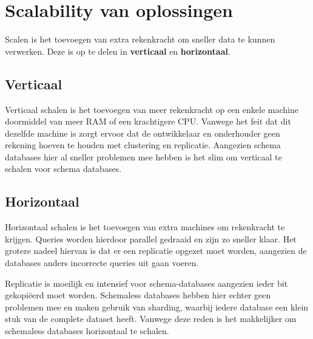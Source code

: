 \section{Scalability van oplossingen}

Scalen is het toevoegen van extra rekenkracht om sneller data te kunnen verwerken. Deze is op te delen in \textbf{verticaal} en \textbf{horizontaal}.

\subsection{Verticaal}

Verticaal schalen is het toevoegen van meer rekenkracht op een enkele machine doormiddel van meer RAM of een krachtigere CPU. Vanwege het feit dat dit dezelfde machine is zorgt ervoor dat de ontwikkelaar en onderhouder geen rekening hoeven te houden met clustering en replicatie. Aangezien schema databases hier al sneller problemen mee hebben is het slim om verticaal te schalen voor schema databases.

\subsection{Horizontaal}

Horizontaal schalen is het toevoegen van extra machines om rekenkracht te krijgen. Queries worden hierdoor parallel gedraaid en zijn zo sneller klaar. Het grotere nadeel hiervan is dat er een replicatie opgezet moet worden, aangezien de databases anders incorrecte queries uit gaan voeren. 

Replicatie is moeilijk en intensief voor schema-databases aangezien ieder bit gekopi\"eerd moet worden. Schemaless databases hebben hier echter geen problemen mee en maken gebruik van sharding, waarbij iedere database een klein stuk van de complete dataset heeft. Vanwege deze reden is het makkelijker om schemaless databases horizontaal te schalen.